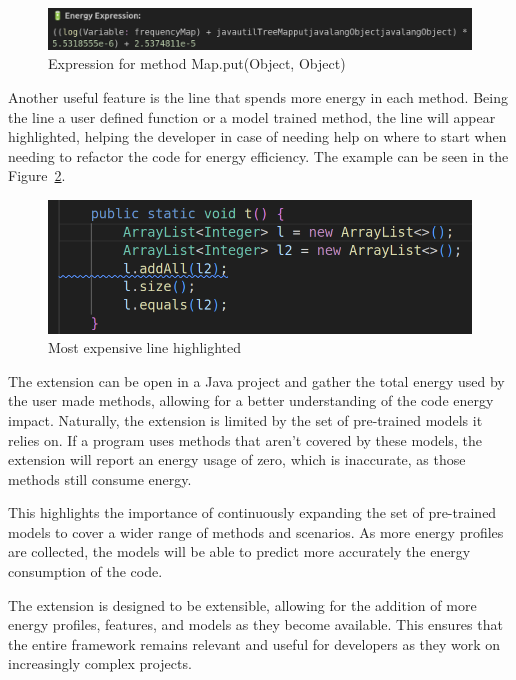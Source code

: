 \begin{figure}[htbp]
  \centering
  \includegraphics[width = .8 \textwidth]{figures/extension_expression_example.png}
  \caption{Expression for method Map.put(Object, Object)}
  \label{fig:extension_expression_example}
\end{figure}


Another useful feature is the line that spends more energy in each method. Being the line a user defined function or a model trained method, the line will appear highlighted, helping the developer in case of needing help on where to start when needing to refactor the code for energy efficiency. The example can be seen in the Figure~\ref{fig:most_expensive_line}.

\begin{figure}[htbp]
  \centering
  \includegraphics[width = .6 \textwidth]{figures/most_expensive_line.png}
  \caption{Most expensive line highlighted}
  \label{fig:most_expensive_line}
\end{figure}

The extension can be open in a Java project and gather the total energy used by the user made methods, allowing for a better understanding of the code energy impact. Naturally, the extension is limited by the set of pre-trained models it relies on. If a program uses methods that aren't covered by these models, the extension will report an energy usage of zero, which is inaccurate, as those methods still consume energy.

This highlights the importance of continuously expanding the set of pre-trained models to cover a wider range of methods and scenarios. As more energy profiles are collected, the models will be able to predict more accurately the energy consumption of the code.

The extension is designed to be extensible, allowing for the addition of more energy profiles, features,  and models as they become available. This ensures that the entire framework remains relevant and useful for developers as they work on increasingly complex projects.